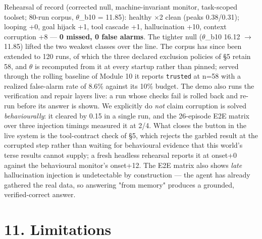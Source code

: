 \documentclass[11pt]{article}
\begin{document}
Rehearsal of record (corrected null, machine-invariant monitor, task-scoped toolset; 80-run corpus, $\theta$\_b10 = 11.85): healthy $\times$2 clean (peaks 0.38/0.31); looping +0, goal hijack +1, tool cascade +1, hallucination +10, context corruption +8 --- \textbf{0 missed, 0 false alarms}. The tighter null ($\theta$\_b10 16.12 $\rightarrow$ 11.85) lifted the two weakest classes over the line. The corpus has since been extended to 120 runs, of which the three declared exclusion policies of \S{}5 retain 58, and $\theta$ is recomputed from it at every startup rather than pinned; served through the rolling baseline of Module 10 it reports \texttt{trusted} at n=58 with a realized false-alarm rate of 8.6\% against its 10\% budget. The demo also runs the verification and repair layers live: a run whose checks fail is rolled back and re-run before its answer is shown. We explicitly do \emph{not} claim corruption is solved \emph{behaviourally}: it cleared by 0.15 in a single run, and the 26-episode E2E matrix over three injection timings measured it at 2/4. What closes the button in the live system is the tool-contract check of \S{}5, which rejects the garbled result at the corrupted step rather than waiting for behavioural evidence that this world's terse results cannot supply; a fresh headless rehearsal reports it at onset+0 against the behavioural monitor's onset+12. The E2E matrix also shows \emph{late} hallucination injection is undetectable by construction --- the agent has already gathered the real data, so answering "from memory" produces a grounded, verified-correct answer.


\section{11. Limitations}
\end{document}
